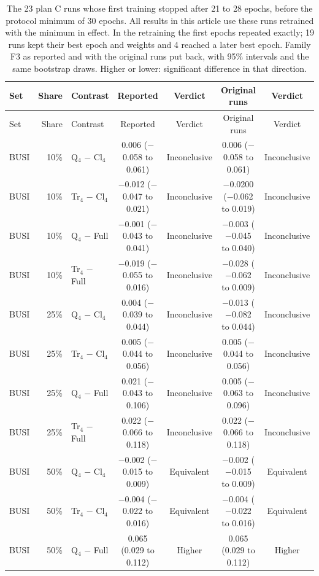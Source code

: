 \begin{longtable}{@{}lrlcccc@{}}
\caption{The 23 plan C runs whose first training stopped after 21 to 28 epochs, before the protocol minimum of 30 epochs. All results in this article use these runs retrained with the minimum in effect. In the retraining the first epochs repeated exactly; 19 runs kept their best epoch and weights and 4 reached a later best epoch. Family F3 as reported and with the original runs put back, with 95\% intervals and the same bootstrap draws. Higher or lower: significant difference in that direction.}\label{stab:min30}\\
\toprule
Set & Share & Contrast & Reported & Verdict & Original runs & Verdict \\
\midrule
\endfirsthead
\toprule
Set & Share & Contrast & Reported & Verdict & Original runs & Verdict \\
\midrule
\endhead
BUSI & 10\% & Q$_4$ $-$ Cl$_4$ & 0.006 ($-$0.058 to 0.061) & Inconclusive & 0.006 ($-$0.058 to 0.061) & Inconclusive \\
BUSI & 10\% & Tr$_4$ $-$ Cl$_4$ & $-$0.012 ($-$0.047 to 0.021) & Inconclusive & $-$0.0200 ($-$0.062 to 0.019) & Inconclusive \\
BUSI & 10\% & Q$_4$ $-$ Full & $-$0.001 ($-$0.043 to 0.041) & Inconclusive & $-$0.003 ($-$0.045 to 0.040) & Inconclusive \\
BUSI & 10\% & Tr$_4$ $-$ Full & $-$0.019 ($-$0.055 to 0.016) & Inconclusive & $-$0.028 ($-$0.062 to 0.009) & Inconclusive \\
BUSI & 25\% & Q$_4$ $-$ Cl$_4$ & 0.004 ($-$0.039 to 0.044) & Inconclusive & $-$0.013 ($-$0.082 to 0.044) & Inconclusive \\
BUSI & 25\% & Tr$_4$ $-$ Cl$_4$ & 0.005 ($-$0.044 to 0.056) & Inconclusive & 0.005 ($-$0.044 to 0.056) & Inconclusive \\
BUSI & 25\% & Q$_4$ $-$ Full & 0.021 ($-$0.043 to 0.106) & Inconclusive & 0.005 ($-$0.063 to 0.096) & Inconclusive \\
BUSI & 25\% & Tr$_4$ $-$ Full & 0.022 ($-$0.066 to 0.118) & Inconclusive & 0.022 ($-$0.066 to 0.118) & Inconclusive \\
BUSI & 50\% & Q$_4$ $-$ Cl$_4$ & $-$0.002 ($-$0.015 to 0.009) & Equivalent & $-$0.002 ($-$0.015 to 0.009) & Equivalent \\
BUSI & 50\% & Tr$_4$ $-$ Cl$_4$ & $-$0.004 ($-$0.022 to 0.016) & Equivalent & $-$0.004 ($-$0.022 to 0.016) & Equivalent \\
BUSI & 50\% & Q$_4$ $-$ Full & 0.065 (0.029 to 0.112) & Higher & 0.065 (0.029 to 0.112) & Higher \\

\end{longtable}
